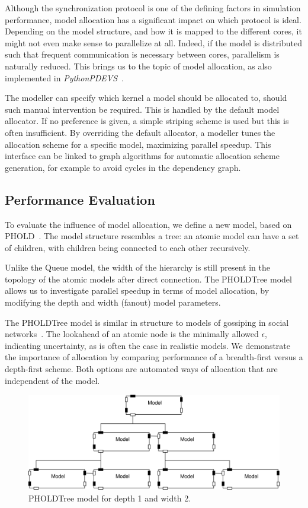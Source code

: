 Although the synchronization protocol is one of the defining factors in simulation performance, model allocation has a significant impact on which protocol is ideal.
Depending on the model structure, and how it is mapped to the different cores, it might not even make sense to parallelize at all.
Indeed, if the model is distributed such that frequent communication is necessary between cores, parallelism is naturally reduced.
This brings us to the topic of model allocation, as also implemented in \textit{PythonPDEVS}~\cite{PythonPDEVS2}.

The modeller can specify which kernel a model should be allocated to, should such manual intervention be required.
This is handled by the default model allocator.
If no preference is given, a simple striping scheme is used but this is often insufficient.
By overriding the default allocator, a modeller tunes the allocation scheme for a specific model, maximizing parallel speedup.
This interface can be linked to graph algorithms for automatic allocation scheme generation, for example to avoid cycles in the dependency graph.

\subsection{Performance Evaluation}
To evaluate the influence of model allocation, we define a new model, based on PHOLD~\cite{PHOLD}.
The model structure resembles a tree: an atomic model can have a set of children, with children being connected to each other recursively.

Unlike the Queue model, the width of the hierarchy is still present in the topology of the atomic models after direct connection.
The PHOLDTree model allows us to investigate parallel speedup in terms of model allocation, by modifying the depth and width (fanout) model parameters.

The PHOLDTree model is similar in structure to models of gossiping in social networks~\cite{Gossip}.
The lookahead of an atomic node is the minimally allowed $\epsilon$, indicating uncertainty, as is often the case in realistic models.
We demonstrate the importance of allocation by comparing performance of a breadth-first versus a depth-first scheme.
Both options are automated ways of allocation that are independent of the model.

\begin{figure}
    \center
    \includegraphics[width=\columnwidth]{fig/pholdtree.pdf}
    \caption{PHOLDTree model for depth 1 and width 2.}
    \label{fig:PHOLDTree_model}
\end{figure}

